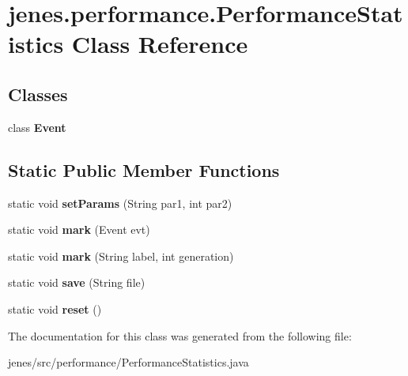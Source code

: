 \hypertarget{classjenes_1_1performance_1_1_performance_statistics}{\section{jenes.\-performance.\-Performance\-Statistics Class Reference}
\label{classjenes_1_1performance_1_1_performance_statistics}
}
\subsection*{Classes}
\begin{DoxyCompactItemize}
\item 
class {\bfseries Event}
\end{DoxyCompactItemize}
\subsection*{Static Public Member Functions}
\begin{DoxyCompactItemize}
\item 
\hypertarget{classjenes_1_1performance_1_1_performance_statistics_a6a2f77191a06922c9bbc3be567c94be4}{static void {\bfseries set\-Params} (String par1, int par2)}\label{classjenes_1_1performance_1_1_performance_statistics_a6a2f77191a06922c9bbc3be567c94be4}

\item 
\hypertarget{classjenes_1_1performance_1_1_performance_statistics_a34a1034b034368f40314908f451a8cc6}{static void {\bfseries mark} (Event evt)}\label{classjenes_1_1performance_1_1_performance_statistics_a34a1034b034368f40314908f451a8cc6}

\item 
\hypertarget{classjenes_1_1performance_1_1_performance_statistics_a3f39608489ba96dca0b07f6f26eae268}{static void {\bfseries mark} (String label, int generation)}\label{classjenes_1_1performance_1_1_performance_statistics_a3f39608489ba96dca0b07f6f26eae268}

\item 
\hypertarget{classjenes_1_1performance_1_1_performance_statistics_a96952887207f02e11b543c4f93f48a18}{static void {\bfseries save} (String file)}\label{classjenes_1_1performance_1_1_performance_statistics_a96952887207f02e11b543c4f93f48a18}

\item 
\hypertarget{classjenes_1_1performance_1_1_performance_statistics_aeb062f4bb2d714e70245c67798ddc3e3}{static void {\bfseries reset} ()}\label{classjenes_1_1performance_1_1_performance_statistics_aeb062f4bb2d714e70245c67798ddc3e3}

\end{DoxyCompactItemize}


The documentation for this class was generated from the following file\-:\begin{DoxyCompactItemize}
\item 
jenes/src/performance/Performance\-Statistics.\-java\end{DoxyCompactItemize}
